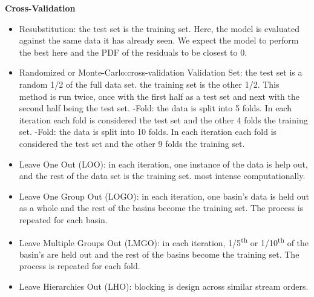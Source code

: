 \textbf{Cross-Validation}
\begin{itemize}
	\item Resubstitution: the test set is the training set. Here, the model is evaluated against the same data it has already seen. We expect the model to perform the best here and the PDF of the residuals to be closest to 0. 
	\item Randomized or Monte-Carlo:cross-validation
		\subitem Validation Set: the test set is a random 1/2 of the full data set. the training set is the other 1/2. This method is run twice, once with the first half as a test set and next with the second half being the test set. 
		-Fold: the data is split into 5 folds. In each iteration each fold is considered the test set and the other 4 folds the training set. 
		-Fold: the data is split into 10 folds. In each iteration each fold is considered the test set and the other 9 folds the training set. 
	\item Leave One Out (LOO): in each iteration, one instance of the data is help out, and the rest of the data set is the training set. most intense computationally.
	\item Leave One Group Out (LOGO): in each iteration, one basin's data is held out as a whole and the rest of the basins become the training set. The process is repeated for each basin. 
	\item Leave Multiple Groups Out (LMGO): in each iteration, 1/5\textsuperscript{th} or 1/10\textsuperscript{th} of the basin's are held out and the rest of the basins become the training set. The process is repeated for each fold. 
	\item Leave Hierarchies Out (LHO): blocking is design across similar stream orders. %
\end{itemize}

